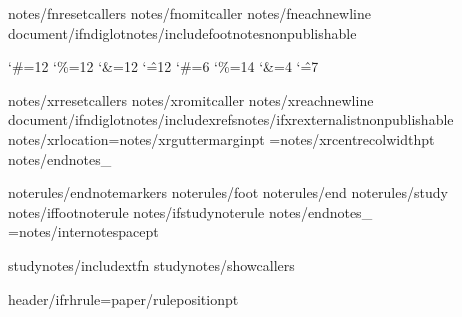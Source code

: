 
{notes/fnresetcallers}
{notes/fnomitcaller}
{notes/fneachnewline}
{document/ifndiglot}{notes/includefootnotes}\expandafter\def\csname f:properties\endcsname{{nonpublishable}}

\catcode`\#=12 \catcode`\%=12 \catcode`\&=12 \catcode`\^=12
\catcode`\#=6 \catcode`\%=14 \catcode`\&=4 \catcode`\^=7
%

{notes/xrresetcallers}
{notes/xromitcaller}
{notes/xreachnewline}
{document/ifndiglot}{notes/includexrefs}{notes/ifxrexternalist}\expandafter\def\csname x:properties\endcsname{{nonpublishable}}
{notes/xrlocation}\def\XrefNotes{{x}}\XrefNotesMargin={notes/xrguttermargin}pt \XrefNotesWidth={notes/xrcentrecolwidth}pt\def\XrefSide{{{notes/xrcolside}}}
{notes/endnotes_}

{noterules/endnotemarkers}
{noterules/foot}
{noterules/end}
{noterules/study}
{notes/iffootnoterule}\def\FootNoteRuleThickness{{0pt}}
{notes/ifstudynoterule}\def\StudyNoteRuleThickness{{0pt}}
{notes/endnotes_}\def\EndNoteRuleThickness{{0pt}}
\InterNoteSpace={notes/internotespace}pt

{studynotes/includextfn}
{studynotes/showcallers}

\def\HeaderPosition{{{paper/headerposition}}}
\def\FooterPosition{{{paper/footerposition}}}
{header/ifrhrule}\RHruleposition={paper/ruleposition}pt
\def\RangeSeparator{{\kern.1em{rangesep_}\kern.1em}} %
\def\ChapterVerseSeparator{{\kern.02em{chvssep_}\kern.02em}} %

